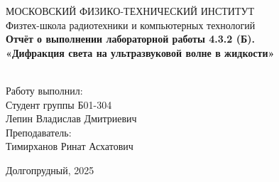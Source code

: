\begin{center}
МОСКОВСКИЙ ФИЗИКО-ТЕХНИЧЕСКИЙ ИНСТИТУТ \\

\hfill \break
Физтех-школа радиотехники и компьютерных технологий\\
\vspace{5cm}
\large{\textbf{Отчёт о выполнении лабораторной работы 4.3.2 (Б). \\ «Дифракция света на ультразвуковой волне в жидкости»}}\\
\hfill \break
\\
\end{center}

\vspace{5cm}
 
\begin{flushright}
Работу выполнил:\\
Студент группы Б01-304\\
Лепин Владислав Дмитриевич\\
Преподаватель:\\
Тимирханов Ринат Асхатович\\
\end{flushright}
 
\vfill


\begin{center} Долгопрудный, 2025 \end{center}

\thispagestyle{empty}
\newpage
